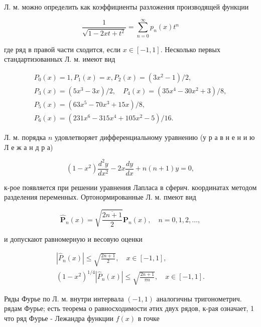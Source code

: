 \documentclass[10pt]{article}
\begin{document}
Л. м. можно определить как коэффициенты разложения производящей функции



\[

\frac{1}{\sqrt{1-2 x t+t^{2}}}=\sum_{n=0}^{\infty} p_{n}(x) t^{n}

\]



где ряд в правой части сходится, если $x \in[-1,1]$. Несколько первых стандартизованных Л. м. имеют вид



\[

\begin{gathered}

P_{0}(x)=1, P_{1}(x)=x, P_{2}(x)=\left(3 x^{2}-1\right) / 2, \\

P_{3}(x)=\left(5 x^{3}-3 x\right) / 2, \quad P_{4}(x)=\left(35 x^{4}-30 x^{2}+3\right) / 8, \\

P_{5}(x)=\left(63 x^{5}-70 x^{3}+15 x\right) / 8, \\

P_{6}(x)=\left(231 x^{6}-315 x^{4}+105 x^{2}-5\right) / 16 .

\end{gathered}

\]



Л. м. порядка $n$ удовлетворяет дифференциальному уравнению (у р а в н е н и ю Л е ж а н д р а)



\[

\left(1-x^{2}\right) \frac{d^{2} y}{d x^{2}}-2 x \frac{d y}{d x}+n(n+1) y=0,

\]



к-рое появляется при решении уравнения Лапласа в сферич. координатах методом разделения переменных. Ортонормированные Л. м. пмеют вид



\[

\widehat{\boldsymbol{P}}_{n}(x)=\sqrt{\frac{\overline{2 n+1}}{2}} \boldsymbol{P}_{n}(x), \quad n=0,1,2, \ldots,

\]



и допускают равномерную и весовую оценки



\[

\begin{gathered}

\left|\hat{P}_{n}(x)\right| \leqslant \sqrt{\frac{2 n+1}{2}}, \quad x \in[-1,1], \\

\left(1-x^{2}\right)^{1 / 4}\left|\hat{P}_{n}(x)\right| \leqslant \sqrt{\frac{2 n+1}{\pi n}}, \quad x \in[-1,1] .

\end{gathered}

\]



Ряды Фурье по Л. м. внутри интервала $(-1,1)$ аналогичны тригонометрич. рядам Фурье; есть теорема о равносходимости әтих двух рядов, к-рая означает, 1 что ряд Фурье - Лежандра функции $f(x)$ в гочке
\end{document}
